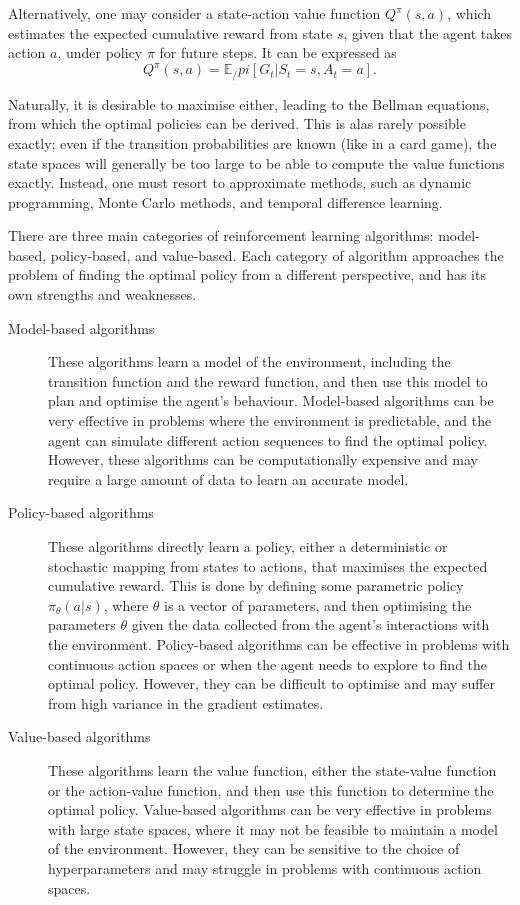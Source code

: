 Alternatively, one may consider a state-action value function $Q^{\pi}(s, a)$, which estimates the expected cumulative reward from state $s$, given that the agent takes action $a$, under policy $\pi$ for future steps.
It can be expressed as
\begin{equation}
    Q^{\pi}(s, a) = \mathbb{E}_/pi \left[ G_t | S_t = s, A_t = a \right].
\end{equation}

Naturally, it is desirable to maximise either, leading to the Bellman equations, from which the optimal policies can be derived.
This is alas rarely possible exactly; even if the transition probabilities are known (like in a card game), the state spaces will generally be too large to be able to compute the value functions exactly.
Instead, one must resort to approximate methods, such as dynamic programming, Monte Carlo methods, and temporal difference learning.

There are three main categories of reinforcement learning algorithms: model-based, policy-based, and value-based. Each category of algorithm approaches the problem of finding the optimal policy from a different perspective, and has its own strengths and weaknesses.

\begin{description}
    \item[Model-based algorithms]
        These algorithms learn a model of the environment, including the transition function and the reward function, and then use this model to plan and optimise the agent's behaviour.
        Model-based algorithms can be very effective in problems where the environment is predictable, and the agent can simulate different action sequences to find the optimal policy.
        However, these algorithms can be computationally expensive and may require a large amount of data to learn an accurate model.

    \item[Policy-based algorithms]
        These algorithms directly learn a policy, either a deterministic or stochastic mapping from states to actions, that maximises the expected cumulative reward.
        This is done by defining some parametric policy $\pi_\theta(a | s)$, where $\theta$ is a vector of parameters, and then optimising the parameters $\theta$ given the data collected from the agent's interactions with the environment.
        Policy-based algorithms can be effective in problems with continuous action spaces or when the agent needs to explore to find the optimal policy.
        However, they can be difficult to optimise and may suffer from high variance in the gradient estimates.

    \item[Value-based algorithms]
        These algorithms learn the value function, either the state-value function or the action-value function, and then use this function to determine the optimal policy.
        Value-based algorithms can be very effective in problems with large state spaces, where it may not be feasible to maintain a model of the environment.
        However, they can be sensitive to the choice of hyperparameters and may struggle in problems with continuous action spaces.
\end{description}

